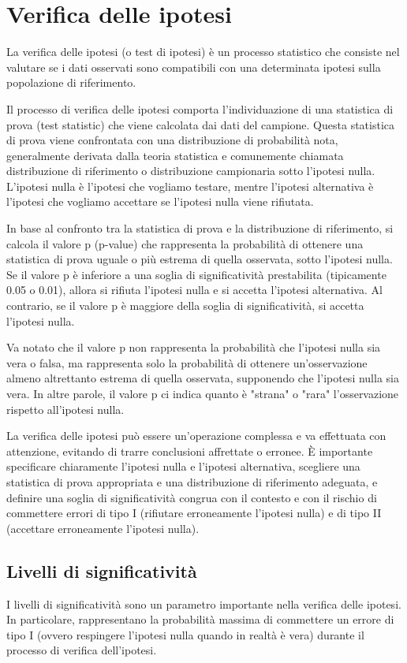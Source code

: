 \chapter{Verifica delle ipotesi}
La verifica delle ipotesi (o test di ipotesi) è un processo statistico che consiste nel valutare se i dati osservati sono compatibili con una determinata ipotesi sulla popolazione di riferimento. 

Il processo di verifica delle ipotesi comporta l'individuazione di una statistica di prova (test statistic) che viene calcolata dai dati del campione. Questa statistica di prova viene confrontata con una distribuzione di probabilità nota, generalmente derivata dalla teoria statistica e comunemente chiamata distribuzione di riferimento o distribuzione campionaria sotto l'ipotesi nulla. L'ipotesi nulla è l'ipotesi che vogliamo testare, mentre l'ipotesi alternativa è l'ipotesi che vogliamo accettare se l'ipotesi nulla viene rifiutata.

In base al confronto tra la statistica di prova e la distribuzione di riferimento, si calcola il valore p (p-value) che rappresenta la probabilità di ottenere una statistica di prova uguale o più estrema di quella osservata, sotto l'ipotesi nulla. Se il valore p è inferiore a una soglia di significatività prestabilita (tipicamente 0.05 o 0.01), allora si rifiuta l'ipotesi nulla e si accetta l'ipotesi alternativa. Al contrario, se il valore p è maggiore della soglia di significatività, si accetta l'ipotesi nulla.

Va notato che il valore p non rappresenta la probabilità che l'ipotesi nulla sia vera o falsa, ma rappresenta solo la probabilità di ottenere un'osservazione almeno altrettanto estrema di quella osservata, supponendo che l'ipotesi nulla sia vera. In altre parole, il valore p ci indica quanto è "strana" o "rara" l'osservazione rispetto all'ipotesi nulla.

La verifica delle ipotesi può essere un'operazione complessa e va effettuata con attenzione, evitando di trarre conclusioni affrettate o erronee. È importante specificare chiaramente l'ipotesi nulla e l'ipotesi alternativa, scegliere una statistica di prova appropriata e una distribuzione di riferimento adeguata, e definire una soglia di significatività congrua con il contesto e con il rischio di commettere errori di tipo I (rifiutare erroneamente l'ipotesi nulla) e di tipo II (accettare erroneamente l'ipotesi nulla).

\section{Livelli di significatività}
I livelli di significatività sono un parametro importante nella verifica delle ipotesi. In particolare, rappresentano la probabilità massima di commettere un errore di tipo I (ovvero respingere l'ipotesi nulla quando in realtà è vera) durante il processo di verifica dell'ipotesi.

